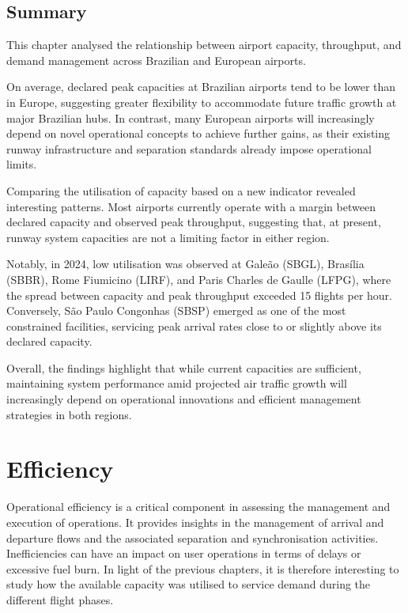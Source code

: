 \documentclass[
  a4paper,
  DIV=11,
  numbers=noendperiod]{scrreport}
\begin{document}
\section{Summary}\label{summary-3}

This chapter analysed the relationship between airport capacity,
throughput, and demand management across Brazilian and European
airports.

On average, declared peak capacities at Brazilian airports tend to be
lower than in Europe, suggesting greater flexibility to accommodate
future traffic growth at major Brazilian hubs. In contrast, many
European airports will increasingly depend on novel operational concepts
to achieve further gains, as their existing runway infrastructure and
separation standards already impose operational limits.

Comparing the utilisation of capacity based on a new indicator revealed
interesting patterns. Most airports currently operate with a margin
between declared capacity and observed peak throughput, suggesting that,
at present, runway system capacities are not a limiting factor in either
region.

Notably, in 2024, low utilisation was observed at Galeão (SBGL),
Brasília (SBBR), Rome Fiumicino (LIRF), and Paris Charles de Gaulle
(LFPG), where the spread between capacity and peak throughput exceeded
15 flights per hour. Conversely, São Paulo Congonhas (SBSP) emerged as
one of the most constrained facilities, servicing peak arrival rates
close to or slightly above its declared capacity.

Overall, the findings highlight that while current capacities are
sufficient, maintaining system performance amid projected air traffic
growth will increasingly depend on operational innovations and efficient
management strategies in both regions.


\chapter{Efficiency}\label{efficiency}

Operational efficiency is a critical component in assessing the
management and execution of operations. It provides insights in the
management of arrival and departure flows and the associated separation
and synchronisation activities. Inefficiencies can have an impact on
user operations in terms of delays or excessive fuel burn. In light of
the previous chapters, it is therefore interesting to study how the
available capacity was utilised to service demand during the different
flight phases.
\end{document}
